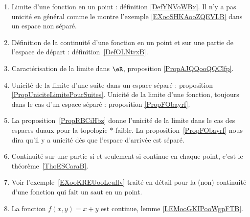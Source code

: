     \label{THEMEooGVCCooHBrNNd}
\begin{enumerate}
	\item
	      Limite d'une fonction en un point : définition \ref{DefYNVoWBx}. Il n'y a pas unicité en général comme le montre l'exemple \ref{EXooSHKAooZQEVLB} dans un espace non séparé.
	\item
	      Définition de la continuité d'une fonction en un point et sur une partie de l'espace de départ : définition~\ref{DefOLNtrxB}.
	\item
	      Caractérisation de la limite dans \( \eR\), proposition \ref{PropAJQQooQQClfp}.
	\item
	      Unicité de la limite d'une suite dans un espace séparé : proposition \ref{PropUniciteLimitePourSuites}. Unicité de la limite d'une fonction, toujours dans le cas d'un espace séparé : proposition \ref{PropFObayrf}.
	\item
	      La proposition~\ref{PropRBCiHbz} donne l'unicité de la limite dans le cas des espaces duaux pour la topologie \( *\)-faible. La proposition~\ref{PropFObayrf} nous dira qu'il y a unicité dès que l'espace d'arrivée est séparé.
	\item
	      Continuité sur une partie si et seulement si continue en chaque point, c'est le théorème~\ref{ThoESCaraB}.
	\item
	      Voir l'exemple~\ref{EXooKREUooLeuIlv} traité en détail pour la (non) continuité d'une fonction qui fait un saut en un point.
	\item
	      La fonction \( f(x,y)=x+y\) est continue, lemme \ref{LEMooGKIPooWgpFTB}.
\end{enumerate}
